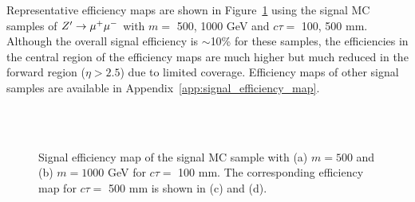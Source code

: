 Representative efficiency maps are shown in Figure~\ref{fig:signal_eff_map} using the signal MC samples of $Z' \rightarrow \mu^{+}\mu^{-}$ with $m=$ 500, 1000 GeV and $c\tau=$ 100, 500 mm. Although the overall signal efficiency is $\sim$10\% for these samples, the efficiencies in the central region of the efficiency maps are much higher but much reduced in the forward region ($\eta > 2.5$) due to limited coverage. Efficiency maps of other signal samples are available in Appendix~\ref{app:signal_efficiency_map}.

\begin{figure}[!htb]
    \centering
     \\
     \\
    \caption{Signal efficiency map of the signal MC sample with (a) $m=500$ and (b) $m=1000$ GeV for $c\tau=$ 100 mm. The corresponding efficiency map for $c\tau=$ 500 mm is shown in (c) and (d).}
    \label{fig:signal_eff_map}
\end{figure}




